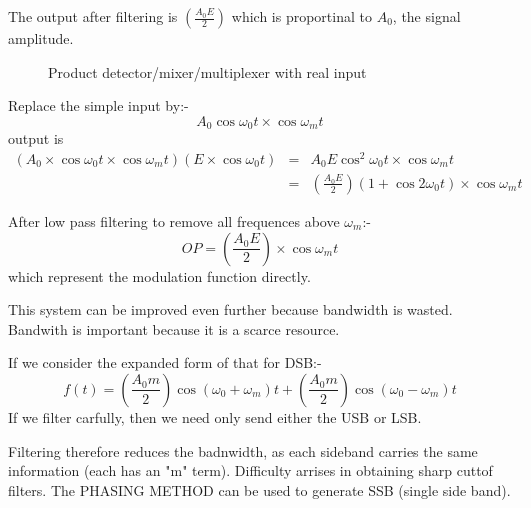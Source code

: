 \documentclass[11pt]{article} %
\begin{document}
The output after filtering is $\left(\frac{A_0E}{2}\right)$ which is proportinal to $A_0$, the signal amplitude.


		\begin{figure}[h]
		\centering
		\caption{Product detector/mixer/multiplexer with real input}
	\end{figure}

Replace the simple input by:-
\begin{equation}
A_0\cos{\omega_0 t} \times \cos{\omega_m t}
\end{equation}
output is
\begin{eqnarray}
(A_0 \times \cos{\omega_0t} \times \cos{\omega_m t})(E\times\cos{\omega_0 t})
&=& A_0 E \cos^2{\omega_0 t}\times\cos{\omega_m t} \\
&=& \left(\frac{A_0 E}{2}\right)(1+\cos{2 \omega_0 t}) \times \cos{\omega_m t}
\end{eqnarray}

After low pass filtering to remove all frequences above $\omega_m$:-
\begin{equation}
OP = \left(\frac{A_0 E}{2}\right) \times \cos{\omega_m t}
\end{equation}which represent the modulation function directly.

This system can be improved even further because bandwidth is wasted. Bandwith is important because it is a scarce resource.

If we consider the expanded form of that for DSB:-
\begin{equation}
f(t) = \left(\frac{A_0m}{2} \right) \cos{\left(\omega_0 + \omega_m\right)}t + \left(\frac{A_0m}{2} \right)  \cos{\left(\omega_0 - \omega_m\right)}t 
\end{equation}
If we filter carfully, then we need only send either the USB or LSB.


Filtering therefore reduces the badnwidth, as each sideband carries the same information (each has an "m" term). Difficulty arrises in obtaining sharp cuttof filters. The PHASING METHOD can be used to generate SSB (single side band).
\end{document}
